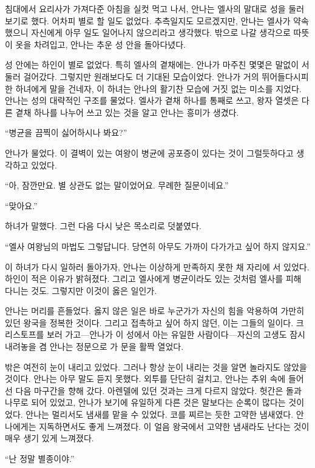 \textbreak

침대에서 요리사가 가져다준 아침을 실컷 먹고 나서, 안나는 엘사의 말대로 성을 둘러보기로 했다. 어차피 별로 할 일도 없었다. 추측일지도 모르겠지만, 안나는 엘사가 약속했으니 자신에게 아무 일도 일어나지 않으리라고 생각했다. 밖으로 나갈 생각으로 따뜻이 옷을 차려입고, 안나는 추운 성 안을 돌아다녔다.

성 안에는 하인이 별로 없었다. 특히 엘사의 곁채에는. 안나가 마주친 몇몇은 말없이 서둘러 걸어갔다. 그렇지만 원래보다도 더 기대된 모습이었다. 안나가 거의 뛰어들다시피 한 하녀에게 말을 건네자, 이 하녀는 안나의 활기찬 모습에 거짓 없는 미소를 지었다. 안나는 성의 대략적인 구조를 물었다. 엘사가 곁채 하나를 통째로 쓰고, 왕자 열셋은 다른 곁채 하나를 나누어 쓰고 있는 것을 알고 안나는 흥미가 생겼다.

``병균을 끔찍이 싫어하시나 봐요?''

안나가 물었다. 이 결벽이 있는 여왕이 병균에 공포증이 있다는 것이 그럴듯하다고 생각하고 있었다.

``아, 잠깐만요. 별 상관도 없는 말이었어요. 무례한 질문이네요.''

``맞아요.''

하녀가 말했다. 그런 다음 다시 낮은 목소리로 덧붙였다.

``엘사 여왕님의 마법도 그렇답니다. 당연히 아무도 가까이 다가가고 싶어 하지 않지요.''

이 하녀가 다시 일하러 돌아가자, 안나는 이상하게 만족하지 못한 채 자리에 서 있었다. 하인이 적은 이유가 밝혀졌다. 그리고 엘사에게 병균이라도 있는 것처럼 엘사를 피해 다니는 것도. 그렇지만 이것이 옳은 일인가.

안나는 머리를 흔들었다. 옳지 않은 일은 바로 누군가가 자신의 힘을 악용하여 가만히 있던 왕국을 정복한 것이다. 그리고 접촉하고 싶어 하지 않던, 이는 그들의 일이다. 크리스토프를 보러 가고—안나가 이 성에서 아는 유일한 사람이다—자신의 고생도 잠시 내려놓을 겸 안나는 정문으로 가 문을 활짝 열었다.

밖은 여전히 눈이 내리고 있었다. 그러나 항상 눈이 내리는 것을 알면 놀라지도 않았을 것이다. 안나는 아무 말도 듣지 못했다. 외투를 단단히 걸치고, 안나는 추위 속에 들어선 다음 마구간을 향해 갔다. 아렌델에 있던 것과는 크게 다르지 않았다. 헛간은 돌과 나무로 되어 있었고, 안나가 보기에 유일하게 다른 것은 말보다는 순록이 많다는 것이었다. 안나는 멀리서도 냄새를 맡을 수 있었다. 코를 찌르는 듯한 고약한 냄새였다. 안나에게는 지독하면서도 좋게 느껴졌다. 이 얼음 왕국에서 고약한 냄새라도 난다는 것이 매우 생기 있게 느껴졌다.

``난 정말 별종이야.''

